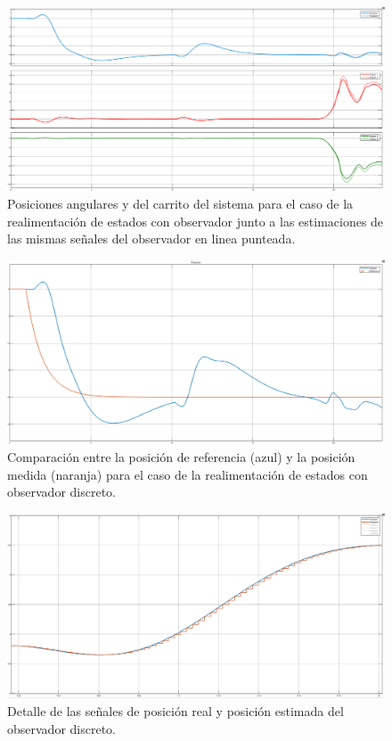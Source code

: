 \begin{figure}[H]
	\centering
	\includegraphics[width=\linewidth]{../Analisis de Resultados/ImagenesAnalisis de Resultados/obsv_vars.png}
	\caption{Posiciones angulares y del carrito del sistema para el caso de la realimentación de estados con observador junto a las estimaciones de las mismas señales del observador en linea punteada.}	
	\label{fig:obsv_vars}
\end{figure}


\begin{figure}[H]
	\centering
	\includegraphics[width=\linewidth]{../Analisis de Resultados/ImagenesAnalisis de Resultados/obsv_disc_posref.png}
	\caption{Comparación entre la posición de referencia (azul) y la posición medida (naranja) para el caso de la realimentación de estados con observador discreto.}	
	\label{fig:obsv_disc_posref}
\end{figure}

\begin{figure}[H]
	\centering
	\includegraphics[width=\linewidth]{../Analisis de Resultados/ImagenesAnalisis de Resultados/obsv_disc_posdisc.png}
	\caption{Detalle de las señales de posición real y posición estimada del observador discreto.}	
	\label{fig:obsv_disc_posdisc}
\end{figure}

